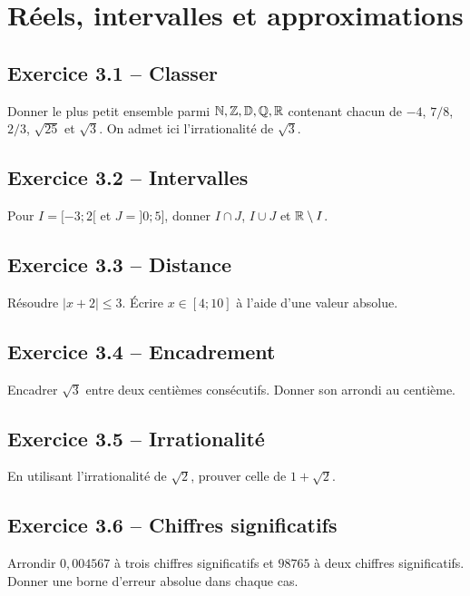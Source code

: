 \chapter{Réels, intervalles et approximations}
\section*{Exercice 3.1 -- Classer}
Donner le plus petit ensemble parmi $\mathbb{N},\mathbb{Z},\mathbb{D},\mathbb{Q},\mathbb{R}$ contenant chacun de $-4$, $7/8$, $2/3$, $\sqrt{25}$ et $\sqrt3$. On admet ici l'irrationalité de $\sqrt3$.

\section*{Exercice 3.2 -- Intervalles}
Pour $I=[-3;2[$ et $J=]0;5]$, donner $I\cap J$, $I\cup J$ et $\mathbb{R}\setminus I$.

\section*{Exercice 3.3 -- Distance}
Résoudre $|x+2|\leq3$. Écrire $x\in[4;10]$ à l'aide d'une valeur absolue.

\section*{Exercice 3.4 -- Encadrement}
Encadrer $\sqrt3$ entre deux centièmes consécutifs. Donner son arrondi au centième.

\section*{Exercice 3.5 -- Irrationalité}
En utilisant l'irrationalité de $\sqrt2$, prouver celle de $1+\sqrt2$.

\section*{Exercice 3.6 -- Chiffres significatifs}
Arrondir $0{,}004567$ à trois chiffres significatifs et $98765$ à deux chiffres significatifs. Donner une borne d'erreur absolue dans chaque cas.
